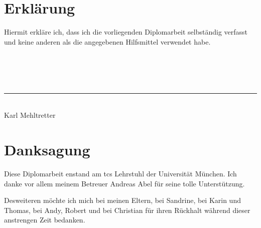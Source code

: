 \chapter*{Erkl\"arung}
Hiermit erkl\"are ich, dass ich die vorliegenden Diplomarbeit selbst\"andig verfasst und keine anderen als die angegebenen Hilfsmittel verwendet habe.
\\
\\
\\
\\
\\
\rule{6cm}{0.4pt}\\
{\Large Karl Mehltretter}\\

\chapter*{Danksagung}
Diese Diplomarbeit enstand am tcs Lehrstuhl der Universit\"at M\"unchen.
Ich danke vor allem meinem Betreuer Andreas Abel f\"ur seine tolle Unterst\"utzung.

Desweiteren m\"ochte ich mich bei meinen Eltern, bei Sandrine, bei Karin und Thomas, bei Andy, Robert und bei Christian f\"ur ihren R\"uckhalt w\"ahrend dieser anstrengen Zeit bedanken.
